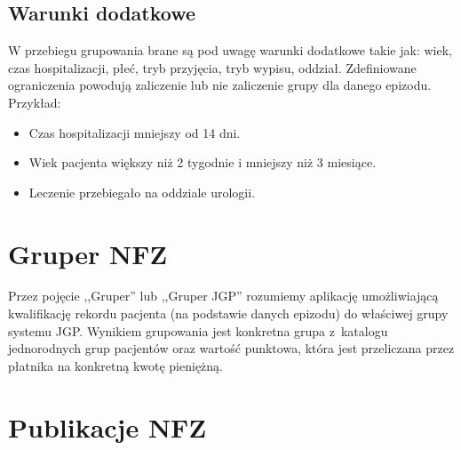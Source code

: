 
\subsection{Warunki dodatkowe}
\label{sec:warunkiDodatkowe}

W przebiegu grupowania brane są pod uwagę warunki dodatkowe takie jak: wiek, czas hospitalizacji, płeć, tryb przyjęcia, tryb wypisu, oddział. Zdefiniowane ograniczenia powodują zaliczenie lub nie zaliczenie grupy dla danego epizodu\cite{algorytm_grupera}.
Przykład:
\begin{itemize}
\item Czas hospitalizacji mniejszy od 14 dni.
\item Wiek pacjenta większy niż 2 tygodnie i mniejszy niż 3 miesiące.
\item Leczenie przebiegało na oddziale urologii.
\end{itemize}


\section{Gruper NFZ}
\label{sec:gruperNFZ}

Przez pojęcie ,,Gruper'' lub ,,Gruper JGP'' rozumiemy aplikację umożliwiającą kwalifikację rekordu pacjenta (na podstawie danych epizodu) do właściwej grupy systemu JGP. Wynikiem grupowania jest konkretna grupa z~katalogu jednorodnych grup pacjentów oraz wartość punktowa, która jest przeliczana przez płatnika na konkretną kwotę pieniężną\cite{kozierkiewicz_jgp}.


\section{Publikacje NFZ}
\label{sec:publikacjeNFZ}

